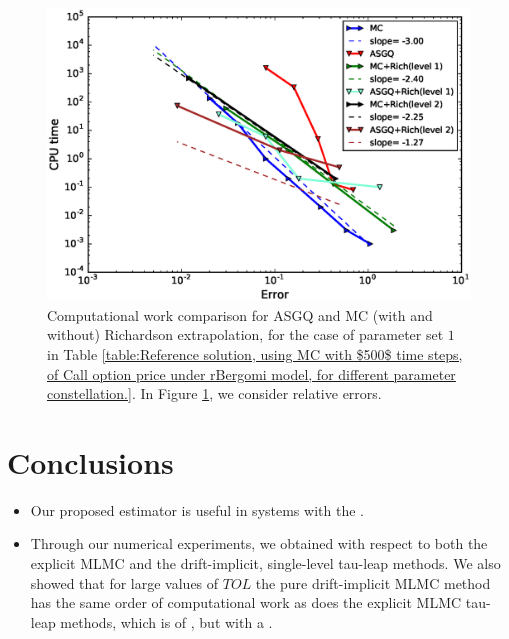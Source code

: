\documentclass[ima, 20pt, portrait, plainboxedsections]{sciposter}
\begin{document}
\begin{multicols}{3}
\begin{figure}[H]
 \begin{center}
\includegraphics[scale=1]{./rBergomi_Complexity_rates/set2/error_vs_time_set2_full_comparison_2}
	\caption{Computational work comparison for  ASGQ and MC (with and without) Richardson extrapolation, for the case of parameter set $1$ in Table \ref{table:Reference solution, using MC with $500$ time steps, of Call option price under rBergomi model, for different parameter constellation.}. In Figure  \ref{fig:Complexity plot for  MISC for Case set $2$ parameters, comparison}, we consider relative errors.}
	\label{fig:Complexity plot for  MISC for Case set $2$ parameters, comparison}
 \end{center}
\end{figure}

\section*{Conclusions}
\begin{itemize}
\item Our proposed estimator is useful in systems with the .
\item Through our numerical experiments, we obtained  with respect to both the explicit MLMC and the drift-implicit, single-level tau-leap methods. We also showed that for large values of $TOL$ the pure drift-implicit MLMC method has the same order of computational work as does the explicit MLMC tau-leap methods, which is of   \cite{Anderson_Complexity}, but with a .
\end{itemize}


\end{multicols}
\end{document}
